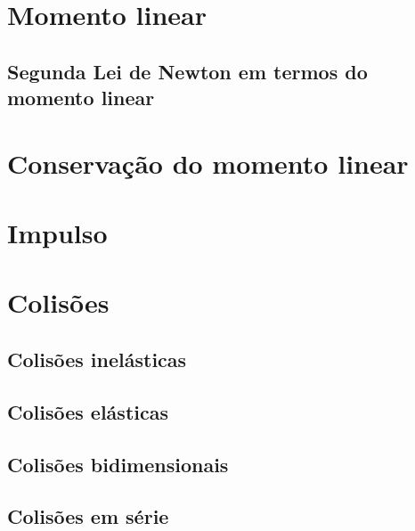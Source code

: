 \section{Momento linear}
\subsection{Segunda Lei de Newton em termos do momento linear}
\section{Conservação do momento linear}
\section{Impulso}
\section{Colisões}
\subsection{Colisões inelásticas}
\subsection{Colisões elásticas}
\subsection{Colisões bidimensionais}
\subsection{Colisões em série}
